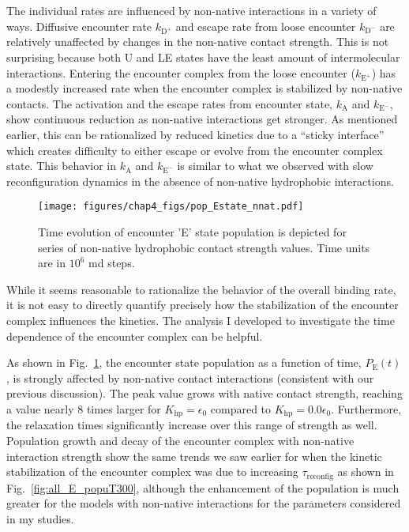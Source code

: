 \documentclass[../talant.diss.submit.tex]{subfiles}
\begin{document}
The individual rates are influenced by non-native interactions in a variety of ways.
Diffusive encounter rate $k_{\mathrm{D}^{+}}$ and escape rate from loose encounter $k_{\mathrm{D}^{-}}$
are  relatively unaffected by changes in the non-native contact strength. This is not surprising
because both U and LE states have the least amount of intermolecular interactions.
Entering the encounter complex from the loose encounter ($k_{\mathrm{E}^{+}}$)
has a modestly increased rate when the encounter complex is stabilized by non-native contacts. The 
activation and the escape rates from encounter state, $k_{\mathrm{A}}$ and $k_{\mathrm{E}^{-}}$,
show continuous reduction as non-native interactions get stronger. As mentioned earlier, this
can be rationalized by reduced kinetics due to a ``sticky interface''
which creates difficulty to either escape or evolve from the encounter complex state.
This behavior in $k_{\mathrm{A}}$ and
$k_{\mathrm{E}^{-}}$ is similar to what we observed with slow reconfiguration dynamics
in the absence of non-native hydrophobic interactions.


\begin{figure}[htp!]
  \centering
  \texttt{[image: figures/chap4\_figs/pop\_Estate\_nnat.pdf]}
  \caption{Time evolution of encounter 'E' state population is depicted for series of
    non-native hydrophobic contact strength values. Time units are in $10^{6}$ md steps.}
  \label{fig:pop_Estate_nnat}
\end{figure}
%
%

While it seems reasonable to rationalize the behavior of the overall binding rate, it is not
easy to directly quantify precisely how the stabilization of the encounter complex
influences the kinetics. The analysis I developed to investigate the time dependence
of the encounter complex can be helpful.

As shown in Fig.~\ref{fig:pop_Estate_nnat}, the
encounter state population as a function of time, $P_\mathrm{E}(t)$,
is strongly affected by non-native contact interactions (consistent with our previous discussion).
The peak value grows with native contact strength, reaching a value nearly 8 times larger
for  $K_{\mathrm{hp}} =\epsilon_0$ compared to 
$K_{\mathrm{hp}} =0.0\epsilon_0$. Furthermore, the relaxation times
significantly increase over this range of strength as well. 
Population growth and decay of the encounter complex with non-native interaction strength
show the same trends we saw earlier for when the kinetic stabilization of the encounter complex was due to increasing $\tau_\mathrm{reconfig}$ as shown in Fig.~\ref{fig:all_E_popuT300},
although the enhancement of the population is much greater for the models with non-native interactions
for the parameters considered in my studies. 
\end{document}
